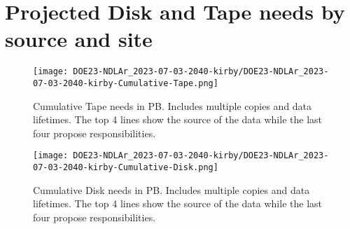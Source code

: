 \section{Projected Disk and Tape needs by source and site}
\begin{figure}[h]
\centering\texttt{[image: DOE23-NDLAr\_2023-07-03-2040-kirby/DOE23-NDLAr\_2023-07-03-2040-kirby-Cumulative-Tape.png]}
\caption{Cumulative Tape needs in PB. Includes multiple copies and data lifetimes. The top 4 lines show the source of the data while the last four propose responsibilities.}
\label{fig:Cumulative-Tape}
\end{figure}
\begin{figure}[h]
\centering\texttt{[image: DOE23-NDLAr\_2023-07-03-2040-kirby/DOE23-NDLAr\_2023-07-03-2040-kirby-Cumulative-Disk.png]}
\caption{Cumulative Disk needs in PB. Includes multiple copies and data lifetimes. The top 4 lines show the source of the data while the last four propose responsibilities.}
\label{fig:Cumulative-Disk}
\end{figure}
